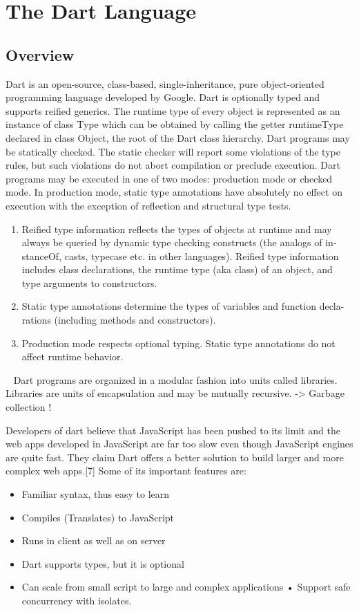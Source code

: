 \section{The Dart Language}
  \subsection{Overview}
  Dart is an open-source, class-based, single-inheritance, pure object-oriented programming language developed by Google. Dart is optionally typed and supports reified generics. The runtime type of every object is represented as an instance of class Type which can be obtained by calling the getter runtimeType declared in class Object, the root of the Dart class hierarchy.
  Dart programs may be statically checked. The static checker will report some violations of the type rules, but such violations do not abort compilation or preclude execution.
  Dart programs may be executed in one of two modes: production mode or checked mode. In production mode, static type annotations have absolutely no effect on execution with the exception of reflection and structural type tests.
  \begin{enumerate}
  \item Reified type information reflects the types of objects at runtime and may always be queried by dynamic type checking constructs (the analogs of in- stanceOf, casts, typecase etc. in other languages). Reified type information includes class declarations, the runtime type (aka class) of an object, and type arguments to constructors.
  \item Static type annotations determine the types of variables and function decla- rations (including methods and constructors).
  \item Production mode respects optional typing. Static type annotations do not affect runtime behavior.
  \end{enumerate}
~\parencite{dartEcma}
Dart programs are organized in a modular fashion into units called libraries. Libraries are units of encapsulation and may be mutually recursive.
\newline
-> Garbage collection !

Developers of dart believe that JavaScript has been pushed to its limit and the web apps developed in JavaScript are far too slow even though JavaScript engines are quite fast. They claim Dart offers a better solution to build larger and more complex web apps.[7]
Some of its important features are:
  \begin{itemize}
  \item Familiar syntax, thus easy to learn
  \item Compiles (Translates) to JavaScript
  \item Runs in client as well as on server
  \item Dart supports types, but it is optional
  \item Can scale from small script to large and complex applications • Support safe concurrency with isolates.
  \end{itemize}

